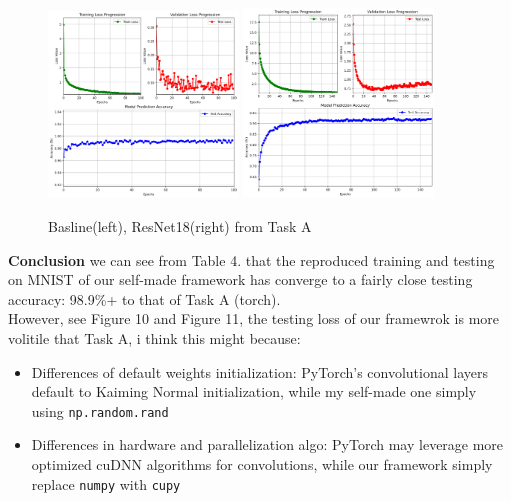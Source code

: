 \documentclass{article}
\begin{document}
\begin{figure}[H]
  \centering
  \includegraphics[width=0.45\textwidth]{fig/train_result_bsln_mnist.png} %
  \includegraphics[width=0.45\textwidth]{fig/train_result_res18.png} %
  \caption{Basline(left), ResNet18(right) from Task A} %
  \label{fig:curve} %
\end{figure}

\noindent\textbf{Conclusion}
we can see from Table 4. that the reproduced training and testing on MNIST of our self-made framework has converge to a fairly close testing accuracy: 98.9\%+ to that of Task A (torch).\\

However, see Figure 10 and Figure 11, the testing loss of our framewrok is more volitile that Task A, i think this might because:
\begin{itemize}
  \item Differences of default weights initialization: PyTorch's convolutional layers default to Kaiming Normal initialization, while my self-made one simply using \texttt{np.random.rand}
  \item Differences in hardware and parallelization algo: PyTorch may leverage more optimized cuDNN algorithms for convolutions, while our framework simply replace \texttt{numpy} with \texttt{cupy}
\end{itemize}
\end{document}
